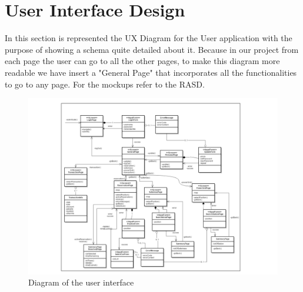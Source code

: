 \section{User Interface Design} \label{sec:user-interface}
In this section is represented the UX Diagram for the User application with the purpose of showing a schema quite detailed about it. Because in our project from each page the user can go to all the other pages, to make this diagram more readable we have insert a "General Page" that incorporates all the functionalities to go to any page. For the mockups refer to the RASD.
\begin{figure}[htbp]
\centering
\includegraphics[width=\textwidth]{Images/UxDiagram.pdf}
\vspace{10pt}
\caption{Diagram of the user interface}
\label{fig:user-interface}
\end{figure}
\clearpage
